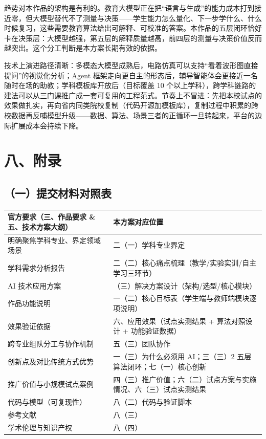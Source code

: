 \documentclass[zihao=-4,a4paper,UTF8,fontset=windows]{ctexart}
\begin{document}
趋势对本作品的架构是有利的。教育大模型正在把“语言与生成”的能力成本打到接近零，但大模型替代不了测量与决策——学生能力怎么量化、下一步学什么、什么时候复习，这些需要教育算法给出可解释、可校准的答案。本作品的五层闭环恰好卡在决策层：大模型越强，第五层的解释质量越高，前四层的测量与决策价值反而越突出。这个分工判断是本方案长期有效的依据。



技术上演进路径清晰：多模态大模型成熟后，电路仿真可以支持“看着波形图直接提问”的视觉化分析；Agent 框架走向更自主的形态后，辅导智能体会更接近一名随时在场的助教；学科模板库开放后（目标覆盖 10 个以上学科），跨学科链路的建法可以从三门课推广成一套可复用的工程范式。节奏上不冒进：先把本校试点的效果做扎实，再向省内同类院校复制（代码开源加模板库），复制过程中积累的跨校数据再反哺模型升级——数据、算法、场景三者的正循环一旦转起来，平台的边际扩展成本会持续下降。

\par\noindent\begin{minipage}{\linewidth}
\section{八、附录}
\subsection{（一）提交材料对照表}
\par\noindent\begin{tabular}{|p{7.08cm}|p{7.08cm}|}
\hline
\textbf{官方要求（三、作品要求 \& 五、技术方案大纲）} & \textbf{本方案对应位置} \\ \hline
明确聚焦学科专业、界定领域场景 & 二（一）学科专业界定 \\ \hline
学科需求分析报告 & 二（二）核心痛点梳理（教学/实验实训/自主学习三环节） \\ \hline
AI 技术应用方案 & （三）解决方案设计（架构/选型/核心模块） \\ \hline
作品功能说明 & 一（二）核心目标表（学生端与教师端模块逐项说明） \\ \hline
效果验证依据 & 六、应用效果（试点实测结果 + 算法对照设计 + 功能验证数据） \\ \hline
跨专业组队分工与协作机制 & 五（三）团队协作 \\ \hline
创新点及对比传统方式优势 & 一（三）为什么必须用 AI；三（三）2 五层算法闭环；七（一）核心创新 \\ \hline
推广价值与小规模试点案例 & 四（三）推广价值；六（二）试点方案与实施情况、六（三）试点实测结果 \\ \hline
代码与模型（可复现性） & 八（二）代码与验证脚本 \\ \hline
参考文献 & 八（三） \\ \hline
学术伦理与知识产权 & 八（四） \\ \hline
\end{tabular}\par
\end{minipage}\par
\end{document}
